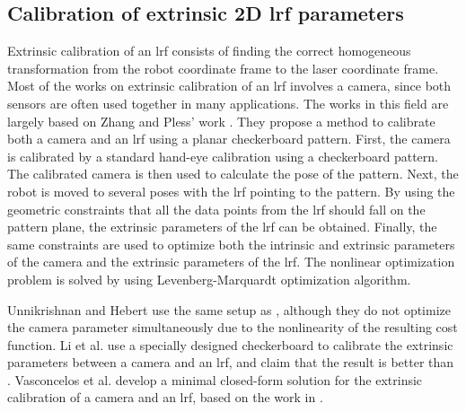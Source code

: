 \subsection{Calibration of extrinsic 2D \ac{lrf} parameters}
\label{sec:laser_calib}
Extrinsic calibration of an \ac{lrf} consists of finding the correct homogeneous transformation from the robot coordinate frame to the laser coordinate frame. Most of the works on extrinsic calibration of an \ac{lrf} involves a camera, since both sensors are often used together in many applications. The works in this field are largely based on Zhang and Pless' work \cite{Zhang2004}. They propose a method to calibrate both a camera and an \ac{lrf} using a planar checkerboard pattern. First, the camera is calibrated by a standard hand-eye calibration  \cite{BouguetJ.Y.2003} using a checkerboard pattern. The calibrated camera is then used to calculate the pose of the pattern. Next, the robot is moved to several poses with the \ac{lrf} pointing to the pattern. By using the geometric constraints that all the data points from the \ac{lrf} should fall on the pattern plane, the extrinsic parameters of the \ac{lrf} can be obtained. Finally, the same constraints are used to optimize both the intrinsic and extrinsic parameters of the camera and the extrinsic parameters of the \ac{lrf}. The nonlinear optimization problem is solved by using Levenberg-Marquardt optimization algorithm.

Unnikrishnan and Hebert \cite{Unnikrishnan2005} use the same setup as \cite{Zhang2004}, although they do not optimize the camera parameter simultaneously due to the nonlinearity of the resulting cost function. 
Li et al. \cite{Li2007} use a specially designed checkerboard to calibrate the extrinsic parameters between a camera and an \ac{lrf}, and claim that the result is better than \cite{Zhang2004}. Vasconcelos et al. \cite{Vasconcelos2012} develop a minimal closed-form solution for the extrinsic calibration of a camera and an \ac{lrf}, based on the work in \cite{Zhang2004}. 

